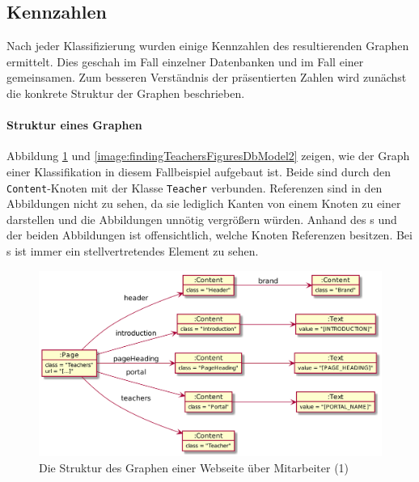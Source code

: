 \subsection{Kennzahlen}
    Nach jeder Klassifizierung wurden einige Kennzahlen des
    resultierenden Graphen ermittelt.
    Dies geschah im Fall einzelner Datenbanken und im Fall
    einer gemeinsamen.
    Zum besseren Verständnis der präsentierten Zahlen wird
    zunächst die konkrete Struktur der Graphen beschrieben.

    \paragraph{Struktur eines Graphen}
    Abbildung \ref{image:findingTeachersFiguresDbModel1}
    und \ref{image:findingTeachersFiguresDbModel2} zeigen,
    wie der Graph einer Klassifikation in diesem Fallbeispiel aufgebaut ist.
    Beide sind durch den \texttt{Content}-Knoten mit der Klasse \texttt{Teacher} verbunden.
    Referenzen sind in den Abbildungen nicht zu sehen,
    da sie lediglich Kanten von einem Knoten zu einer {\resource} darstellen
    und die Abbildungen unnötig vergrößern würden.
    Anhand des {\classificationModel}s und der beiden Abbildungen ist
    offensichtlich, welche Knoten Referenzen besitzen.
    Bei {\collectionFeature}s ist immer ein stellvertretendes Element zu sehen.

    \begin{figure}[htb]
        \centering
        \includegraphics[scale=\imageScalingFactor]{../resources/findings/case-study-1/dbmodel/dbmodel1.png}
        \caption{Die Struktur des Graphen einer Webseite über Mitarbeiter (1)}
        \label{image:findingTeachersFiguresDbModel1}
    \end{figure}

